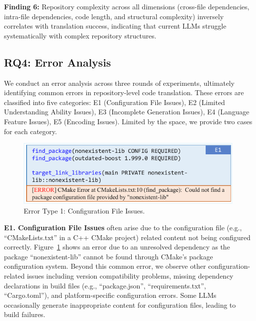 \begin{myboxc} \textbf{Finding 6: }
Repository complexity across all dimensions (cross-file dependencies, intra-file dependencies, code length, and structural complexity) inversely correlates with translation success, indicating that current LLMs struggle systematically with complex repository structures.
\end{myboxc}



\subsection{RQ4: Error Analysis}

We conduct an error analysis across three rounds of experiments, ultimately identifying common errors in repository-level code translation. These errors are classified into five categories: E1 (Configuration File Issues), E2 (Limited Understanding Ability Issues), E3 (Incomplete Generation Issues), E4 (Language Feature Issues), E5 (Encoding Issues). Limited by the space, we provide two cases for each category.


\begin{figure}
    \centering
    \includegraphics[width=\linewidth]{figures/E1.pdf}
    \caption{Error Type 1: Configuration File Issues.}
    \label{fig:ErrorType1}
\end{figure}


\textbf{E1. Configuration File Issues} often arise due to the configuration file (e.g., ``CMakeLists.txt'' in a C++ CMake project) related content not being configured correctly. Figure~\ref{fig:ErrorType1} shows an error due to an unresolved dependency as the package ``nonexistent-lib'' cannot be found through CMake's package configuration system.
Beyond this common error, we observe other configuration-related issues including version compatibility problems, missing dependency declarations in build files (e.g., ``package.json'', ``requirements.txt'', ``Cargo.toml''), and platform-specific configuration errors. Some LLMs occasionally generate inappropriate content for configuration files, leading to build failures.

